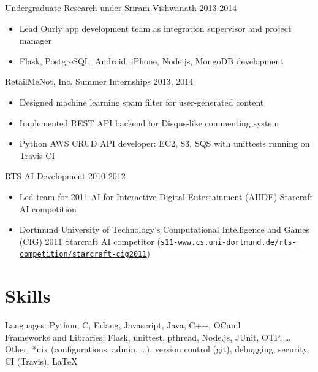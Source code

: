 \documentclass[line,margin]{res}
\begin{document}
\begin{resume}
    \vspace{-6pt}
    Undergraduate Research under Sriram Vishwanath
    \hfill  2013-2014
        \begin{itemize} \itemsep -2pt
        \item Lead Ourly app development team as integration supervisor and project manager
        \item Flask, PostgreSQL, Android, iPhone, Node.js, MongoDB development
        \end{itemize}

    \vspace{-6pt}
    RetailMeNot, Inc. Summer Internships
    \hfill  2013, 2014
        \begin{itemize} \itemsep -2pt
        \item Designed machine learning spam filter for user-generated content
        \item Implemented REST API backend for Disqus-like commenting system
        \item Python AWS CRUD API developer: EC2, S3, SQS with unittests running on Travis CI
        \end{itemize}

    \vspace{-6pt}
    RTS AI Development
    \hfill  2010-2012
        \begin{itemize} \itemsep -2pt
        \item Led team for 2011 AI for Interactive Digital Entertainment (AIIDE) Starcraft AI competition  
        \item Dortmund University of Technology’s Computational Intelligence and Games (CIG) 2011 Starcraft AI
            competitor (\href{https://www.s11-www.cs.uni-dortmund.de/rts-competition/starcraft-cig2011}{\texttt{s11-www.cs.uni-dortmund.de/rts-competition/starcraft-cig2011}})
        \end{itemize}


\vspace{-8pt}
\section{Skills}
    \vspace{12pt} 
        Languages: Python, C, Erlang, Javascript, Java, C++, OCaml \\ 
        Frameworks and Libraries: Flask, unittest, pthread, Node.js, JUnit, OTP, \ldots \\
        Other: *nix (configurations, admin, \ldots), version control (git), debugging, security, CI (Travis), \LaTeX



\end{resume}
\end{document}
